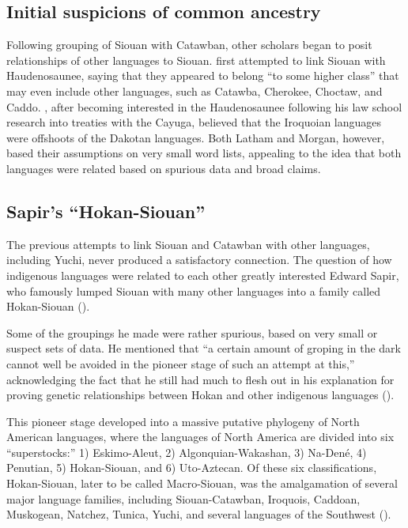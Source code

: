 \documentclass[output=paper]{LSP/langsci}
\begin{document}
\subsection{Initial suspicions of common ancestry}

Following  grouping of Siouan with Catawban, other scholars began to posit relationships of other languages to Siouan. \citet{Latham1856} first attempted to link Siouan with Haudenosaunee, saying that they appeared to belong ``to some higher class'' that may even include other languages, such as Catawba, Cherokee, Choctaw, and Caddo. \citet{Morgan1871}, after becoming interested in the Haudenosaunee following his law school research into treaties with the Cayuga, believed that the Iroquoian languages were offshoots of the Dakotan languages. Both Latham and Morgan, however, based their assumptions on very small word lists, appealing to the idea that both languages were related based on spurious data and broad claims.

\subsection{Sapir's ``Hokan-Siouan''}

The previous attempts to link Siouan and Catawban with other languages, including Yuchi, never produced a satisfactory connection. The question of how indigenous languages were related to each other greatly interested Edward Sapir, who famously lumped Siouan with many other languages into a family called Hokan-Siouan (\citealt{Sapir1929}). 

Some of the groupings he made were rather spurious, based on very small or suspect sets of data. He mentioned that ``a certain amount of groping in the dark cannot well be avoided in the pioneer stage of such an attempt at this,'' acknowledging the fact that he still had much to flesh out in his explanation for proving genetic relationships between Hokan and other indigenous languages (\citealt[289]{Sapir1920}). 

This pioneer stage developed into a massive putative phylogeny of North American languages, where the languages of North America are divided into six ``superstocks:'' 1) Eskimo-Aleut, 2) Algonquian-Wakashan, 3) Na-Den\'e, 4) Penutian, 5) Hokan-Siouan, and 6) Uto-Aztecan. Of these six classifications, Hokan-Siouan, later to be called Macro-Siouan, was the amalgamation of several major language families, including Siouan-Catawban, Iroquois, Caddoan, Muskogean, Natchez, Tunica, Yuchi, and several languages of the Southwest (\citealt{Sapir1929}). 
\end{document}
